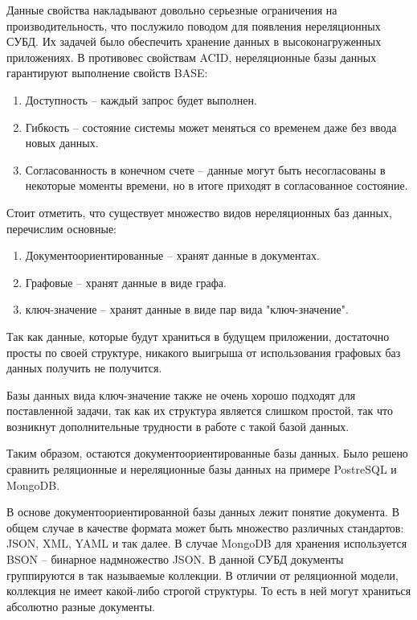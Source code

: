 Данные свойства накладывают довольно серьезные ограничения на производительность, что
послужило поводом для появления нереляционных СУБД. Их задачей было
обеспечить хранение данных в высоконагруженных приложениях. В противовес
свойствам ACID, нереляционные базы данных гарантируют выполнение свойств BASE:

\begin{enumerate}
	\item Доступность -- каждый запрос будет выполнен.
	\item Гибкость -- состояние системы может меняться со временем даже без ввода новых данных.
	\item Согласованность в конечном счете -- данные могут быть несогласованы в некоторые
	      моменты времени, но в итоге приходят в согласованное состояние.
\end{enumerate}

Стоит отметить, что существует множество видов нереляционных баз данных, перечислим
основные:

\begin{enumerate}
	\item Документоориентированные -- хранят данные в документах.
	\item Графовые -- хранят данные в виде графа.
	\item ключ-значение -- хранят данные в виде пар вида "ключ-значение".
\end{enumerate}

Так как данные, которые будут храниться в будущем приложении, достаточно просты по своей структуре,
никакого выигрыша от использования графовых баз данных получить не получится.

Базы данных вида ключ-значение также не очень хорошо подходят для поставленной задачи, так как их структура
является слишком простой, так что возникнут дополнительные трудности в работе с такой базой данных.

Таким образом, остаются документоориентированные базы данных. Было решено сравнить реляционные и нереляционные
базы данных на примере PostreSQL и MongoDB.

В основе документоориентированной базы данных лежит понятие документа. В общем случае в качестве формата
может быть множество различных стандартов: JSON, XML, YAML и так далее. В случае MongoDB для хранения
используется BSON\cite{MongoDBDocs} -- бинарное надмножество JSON. В данной СУБД документы группируются в так называемые
коллекции. В отличии от реляционной модели, коллекция не имеет какой-либо строгой структуры. То есть
в ней могут храниться абсолютно разные документы.

